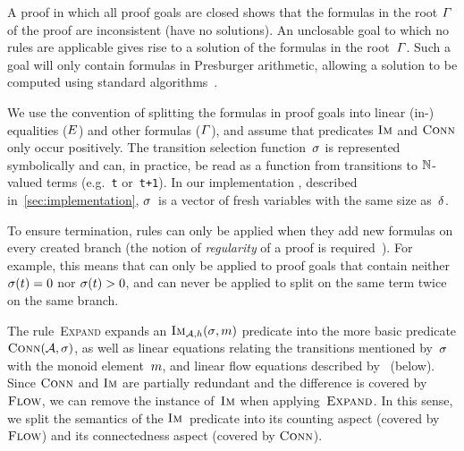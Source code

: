 A proof in which all proof goals are closed shows that the formulas
in the root $\varGamma$ of the proof are inconsistent (have no solutions).
An unclosable goal to which no rules are applicable
gives rise to a solution of the formulas in the
root~$\varGamma$. Such a goal will only contain formulas
in Presburger arithmetic, allowing a solution to be computed using
standard algorithms~\cite{DBLP:books/daglib/0022394}.

We use the convention of splitting the formulas in proof goals into
linear (in-) equalities ($E$) and other formulas
($\varGamma$), and assume that predicates $\operatorname{\textsc{Im}}$ and $\operatorname{\textsc{Conn}}$
only occur positively.
%
The transition selection function~$\operatorname{\sigma}$ is represented
symbolically and can, in practice, be read as a function from
transitions to $\mathbb{N}$-valued terms (e.g.~\texttt{t}
or~\texttt{t+1}). In our implementation \Catra{}, described 
in~\cref{sec:implementation}, $\operatorname{\sigma}$~is a vector of fresh variables
with the same size as~$\delta$.

To ensure termination, rules can only be applied when they add new formulas
on every created branch (the notion of \emph{regularity} of a proof is
required~\cite{Fitting96a}). For example, this means that \Split{} can
only be applied to proof goals that contain neither
$\operatorname{\sigma}(t) = 0$ nor $\operatorname{\sigma}(t) > 0$, and can
never be applied to split on the same term twice on the same branch.

The rule~\textsc{Expand} expands an $\operatorname{\textsc{Im}}_{\mathcal{A}, h}(\operatorname{\sigma}, m)$
predicate into the more basic predicate
$\operatorname{\textsc{Conn}}(\mathcal{A}, \operatorname{\sigma})$, as well as linear equations
relating the transitions mentioned by~$\operatorname{\sigma}$ with the monoid
element~$m$, and linear flow equations described
by~\FlowEq{} (below). Since $\operatorname{\textsc{Conn}}$ and $\operatorname{\textsc{Im}}$ are partially
redundant and the difference is covered by~$\textsc{Flow}$, we can remove
the instance of~$\operatorname{\textsc{Im}}$ when applying~$\textsc{Expand}$. In this sense, we
split the semantics of the $\operatorname{\textsc{Im}}$~predicate into its counting aspect
(covered by $\textsc{Flow}$) and its connectedness aspect (covered by
$\operatorname{\textsc{Conn}}$).

